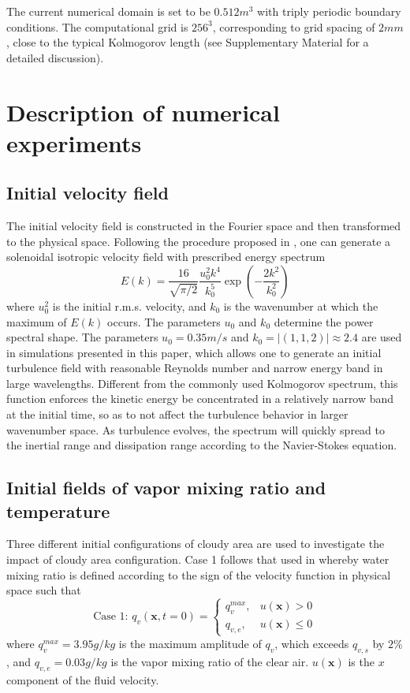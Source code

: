 \documentclass[draft,linenumbers]{agujournal}
\begin{document}
The current numerical domain is set to be $0.512m^{3}$ with triply periodic boundary conditions. The computational grid is $256^{3}$, corresponding to grid spacing of $2mm$, close to the typical Kolmogorov length {(see Supplementary Material for a detailed discussion)}.

\section{Description of numerical experiments}\label{experiment_description}

\subsection{Initial velocity field}   
The initial velocity field is constructed in the Fourier space and then transformed to the physical space. Following the procedure proposed in \citet{Rogallo81}, one can generate a solenoidal isotropic velocity field with prescribed energy spectrum \citep{Rosales05}
\begin{equation}
E(k) = \frac{16}{\sqrt{\pi/2}}\frac{u_0^2k^4}{k_0^5}\exp(-\frac{2k^2}{k_0^2})
\end{equation}
where $u_0^2$ is the initial r.m.s. velocity, and $k_0$ is the wavenumber at which the maximum of $E(k)$ occurs. The parameters $u_0$ and $k_0$ determine the power spectral shape. {The parameters $u_0 = 0.35m/s$ and $k_0 = |(1,1,2)| \approx 2.4$ are used in simulations presented in this paper, which allows one to generate an initial turbulence field with reasonable Reynolds number and narrow energy band in large wavelengths.} Different from the commonly used Kolmogorov spectrum, this function enforces the kinetic energy be concentrated in a relatively narrow band at the initial time, so as to not affect the turbulence behavior in larger wavenumber space. As turbulence evolves, the spectrum will quickly spread to the inertial range and dissipation range according to the Navier-Stokes equation.

\subsection{Initial fields of vapor mixing ratio and temperature}
Three different initial configurations of cloudy area are used to investigate the impact of cloudy area configuration. Case 1 follows that used in \citet{And04} whereby water mixing ratio is defined according to the sign of the velocity function in physical space such that
\begin{equation}
\mbox{Case 1: } q_v(\mathbf{x},t=0) = 
\left\{\begin{array}{lr}
q_v^{max}, & u(\mathbf{x}) > 0\\
q_{v,e}, & u(\mathbf{x}) \le 0
\end{array}\right.\label{case1}
\end{equation}
where $q_v^{max} = 3.95 g/kg$ is the maximum amplitude of $q_v$, which exceeds $q_{v,s}$ by $2\%$, and $q_{v,e} = 0.03g/kg$ is the vapor mixing ratio of the clear air. $u(\mathbf{x})$ is the $x$ component of the fluid velocity. 
\end{document}
